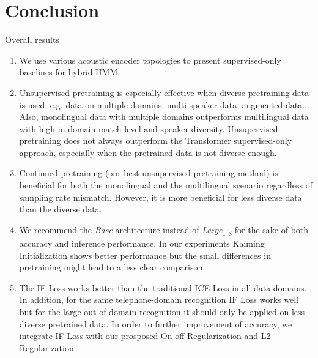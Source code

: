 \section{Conclusion}

\begin{frame}{Overall results}
\begin{enumerate}
    \item We use various acoustic encoder topologies to present supervised-only baselines for hybrid HMM.
    
    \item Unsupervised pretraining is especially effective when diverse pretraining data is used, e.g. data on multiple domains, multi-speaker data, augmented data...
    Also, monolingual data with multiple domains outperforms multilingual data with high in-domain match level and speaker diversity.
    Unsupervised pretraining does not always outperform the Transformer supervised-only approach, especially when the pretrained data is not diverse enough.
    
    \item Continued pretraining (our best unsupervised pretraining method) is beneficial for both the monolingual and the multilingual scenario regardless of sampling rate mismatch.
    However, it is more beneficial for less diverse data than the diverse data.
    
    \item We recommend the \textit{Base} architecture instead of \textit{Large}\textsubscript{1-8} for the sake of both accuracy and inference performance.
    In our experiments Kaiming Initialization shows better performance but the small differences in pretraining might lead to a less clear comparison.
    
    \item %
    The IF Loss works better than the traditional ICE Loss in all data domains.
    In addition, for the same telephone-domain recognition IF Loss works well but for the large out-of-domain recognition it should only be applied on less diverse pretrained data.
    In order to further improvement of accuracy, we integrate IF Loss with our prosposed On-off Regularization and L2 Regularization.
\end{enumerate}
\end{frame}


